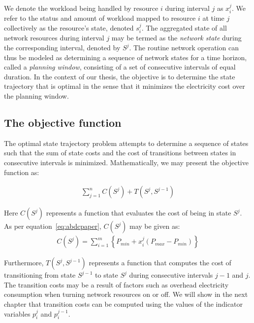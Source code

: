 We denote the workload being handled by resource $i$ during interval $j$ as $x_i^j$. We refer to the status and amount of workload mapped to resource $i$ at time $j$ collectively as the resource's state, denoted $s_i^j$. The aggregated state of all network resources during interval $j$ may be termed as the \textit{network state} during the corresponding interval, denoted by $S^j$. The routine network operation can thus be modeled as determining a sequence of network states for a time horizon, called a \textit{planning window}, consisting of a set of consecutive intervals of equal duration. In the context of our thesis, the objective is to determine the state trajectory that is optimal in the sense that it minimizes the electricity cost over the planning window. %

\subsection{The objective function}
\label{subsec:framework:objective} %
The optimal state trajectory problem attempts to determine a sequence of states such that the sum of state costs and the cost of transitions between states in consecutive intervals is minimized. Mathematically, we may present the objective function as:

\begin{align}
\sum_{j=1}^n C(S^j) + T(S^j, S^{j-1})\label{eq:genobjective}
\end{align}

Here $C(S^j)$ represents a function that evaluates the cost of being in state $S^j$. As per equation~\ref{eq:abdcpaper}, $C(S^j)$ may be given as:
\begin{align}
C(S^j) = \sum_{i=1}^m \left\{ P_{min} + x_i^j (P_{max} - P_{min}) \right\}
\end{align}

Furthermore, $T(S^j,S^{j-1})$ represents a function that computes the cost of transitioning from state $S^{j-1}$ to state $S^j$ during consecutive intervals $j-1$ and $j$. The transition costs may be a result of factors such as overhead electricity consumption when turning network resources on or off. We will show in the next chapter that transition costs can be computed using the values of the indicator variables $p_i^j$ and $p_i^{j-1}$.

